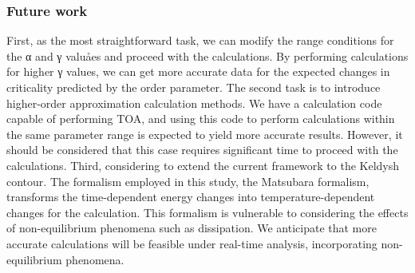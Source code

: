 \documentclass{article}[12pt]
\numberwithin{equation}{section}
\begin{document}
\begin{spacing}{1.5}
\subsubsection*{Future work}
First, as the most straightforward task, we can modify the range conditions for the α and γ valuåes and proceed with the calculations. By performing calculations for higher γ values, we can get more accurate data for the expected changes in criticality predicted by the order parameter.
The second task is to introduce higher-order approximation calculation methods. We have a calculation code capable of performing TOA, and using this code to perform calculations within the same parameter range is expected to yield more accurate results. However, it should be considered that this case requires significant time to proceed with the calculations.
Third, considering to extend the current framework to the Keldysh contour. The formalism employed in this study, the Matsubara formalism, transforms the time-dependent energy changes into temperature-dependent changes for the calculation. This formalism is vulnerable to considering the effects of non-equilibrium phenomena such as dissipation. We anticipate that more accurate calculations will be feasible under real-time analysis, incorporating non-equilibrium phenomena.
\end{spacing}
\pagebreak
\newpage
\appendix
\end{document}
